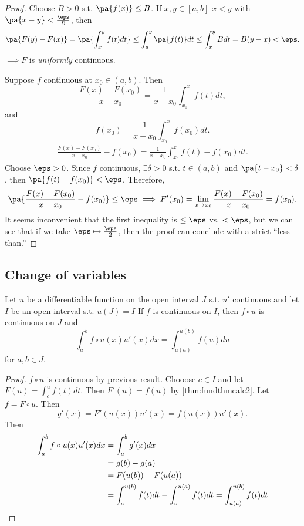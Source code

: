 \documentclass[11pt]{scrartcl}
\numberwithin{equation}{section}
\begin{document}
\begin{proof}
    Choose $B>0$ s.t. $\pa{f(x)}\leq B$. If $x,y\in [a,b]$ $x<y$ with 
    $\pa{x-y} < \frac{\eps}{B}$, then 
    \[
        \pa{F(y)-F(x)} = \pa{\int_{x}^{y}f(t)dt} \leq \int_{a}^{y}\pa{f(t)}dt \leq \int_{x}^{y}Bdt = B(y-x) < \eps.
    \]
    $\implies F$ is \textit{uniformly} continuous.

    Suppose $f$ continuous at $x_0\in(a,b)$. Then 
    \[
        \frac{F(x)-F(x_0)}{x-x_0} = \frac{1}{x-x_0}\int_{x_0}^{x}f(t)dt,
    \]
    and
    \[
        f(x_0) = \frac{1}{x-x_0}\int_{x_0}^{x}f(x_0)dt.
    \]
    \begin{align*}
        \frac{F(x) - F(x_0)}{x-x_0} - f(x_0) = \frac{1}{x-x_0}\int_{x_0}^{x}f(t)-f(x_0)dt.
    \end{align*}
    Choose $\eps>0$. Since $f$ continuous, $\exists \delta>0$ s.t. 
    $t\in(a,b)$ and $\pa{t-x_0} < \delta$, then $\pa{f(t)-f(x_0)}<\eps$.
    Therefore, 
    \[
        \pa{\frac{F(x)-F(x_0)}{x-x_0}-f(x_0)} \leq \eps 
        \implies 
        F'(x_0) = \lim_{x\rightarrow x_0}\frac{F(x)-F(x_0)}{x-x_0} = f(x_0).
    \]
    It seems inconvenient that the first inequality is $\leq \eps$ vs. 
    $<\eps$, but we can see that if we take $\eps\mapsto \frac{\eps}{2}$, then 
    the proof can conclude with a strict ``less than.''
\end{proof}

\subsection{Change of variables}
\begin{theorem}
    \label{thm:changevars}
    Let $u$ be a differentiable function on the open interval $J$ s.t. 
    $u'$ continuous and let $I$ be an open interval s.t. $u(J)= I$ 
    If $f$ is continuous on $I$, then $f \circ u$ is continuous on $J$ 
    and
    \[
        \int_{a}^{b}f\circ u(x) u'(x)dx = \int_{u(a)}^{u(b)}f(u)du 
    \]
    for $a,b\in J$.
\end{theorem}

\begin{proof}
    $f \circ u $ is continuous by previous result. Chooose $c\in I$ and 
    let $F(u) = \int_{c}^{u}f(t)dt$. Then $F'(u)=f(u)$ by 
    \cref{thm:fundthmcalc2}. Let $f=F\circ u$. Then 
    \[
        g'(x) = F'(u(x))u'(x) = f(u(x))u'(x).
    \]
    Then 
    \begin{align*}
        \int_{a}^{b}f\circ u(x)u'(x)dx &= \int_{a}^{b}g'(x)dx  \\
        &= g(b)-g(a) \\
        &= F(u(b))-F(u(a)) \\
        &= \int_{c}^{u(b)}f(t)dt - \int_{c}^{u(a)}f(t)dt = \int_{u(a)}^{u(b)}f(t)dt \qedhere
    \end{align*}
\end{proof}
\end{document}
